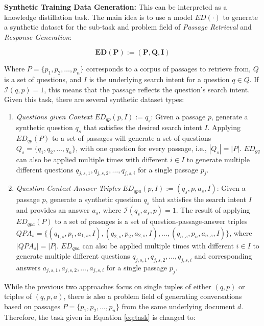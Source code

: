 \vspace{\baselineskip} %
\noindent\textbf{Synthetic Training Data Generation:} This can be interpreted as a knowledge distillation task. The main idea is to use a model $ED(\cdot)$ to generate a synthetic dataset for the sub-task and problem field of \textit{Passage Retrieval} and \textit{Response Generation}:

\begin{equation}
    \mathbf{ED(P) := (P, Q, I)}
    \label{eq:task}
\end{equation}

Where $P = \{p_1, p_2, \dots, p_n\}$ corresponds to a corpus of passages to retrieve from, $Q$ is a set of questions, and $I$ is the underlying search intent for a question $q \in Q$. If $\mathcal{I}(q,p) = 1$, this means that the passage reflects the question's search intent. Given this task, there are several synthetic dataset types:

\begin{enumerate}
    \item \textit{Questions given Context} $ED_{qp}(p,I) := q_s$: Given a passage $p$, generate a synthetic question $q_s$ that satisfies the desired search intent $I$. Applying $ED_{qp}(P)$ to a set of passages will generate a set of questions $Q_s = \{q_1, q_2, \dots, q_n\}$, with one question for every passage, i.e., $|Q_s| = |P|$. $ED_{gq}$ can also be applied multiple times with different $i \in I$ to generate multiple different questions $q_{j,s,1}, q_{j,s,2}, \dots , q_{j,s,i}$ for a single passage $p_j$.
    \item \textit{Question-Context-Answer Triples} $ED_{qpa}(p, I) := (q_s, p, a_s, I)$: Given a passage $p$, generate a synthetic question $q_s$ that satisfies the search intent $I$ and provides an answer $a_s$, where $\mathcal{I}(q_s, a_s, p) = 1$. The result of applying $ED_{qpa}(P)$ to a set of passages is a set of question-passage-answer triples $QPA_s = \allowbreak \{(q_{1,s}, p_1, a_{1,s}, I), \allowbreak (q_{2,s}, p_2, a_{2,s}, I), \allowbreak \dots, (q_{n,s}, p_n, a_{n,s}, I)\}$, where $|QPA_s| = |P|$. $ED_{qpa}$ can also be applied multiple times with different $i \in I$ to generate multiple different questions $q_{j,s,1}, \allowbreak q_{j,s,2}, \dots , q_{j,s,i}$ and corresponding answers $a_{j,s,1}, \allowbreak a_{j,s,2}, \dots , a_{j,s,i}$ for a single passage $p_j$.
\end{enumerate}

While the previous two approaches focus on single tuples of either $(q,p)$ or triples of $(q,p,a)$, there is also a problem field of generating conversations based on passages $P = \{p_1, p_2, \dots, p_n\}$ from the same underlying document $d$. Therefore, the task given in Equation \ref{eq:task} is changed to:

